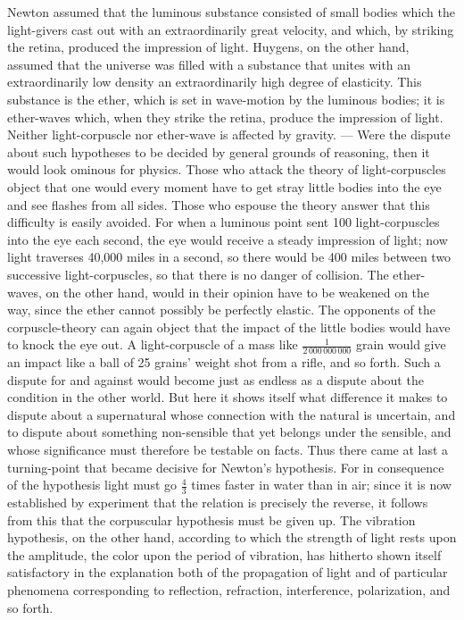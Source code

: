 \documentclass[12pt]{book}
\begin{document}
Newton assumed that the luminous substance consisted of small bodies which the
light-givers cast out with an extraordinarily great velocity, and which, by striking
the retina, produced the impression of light. Huygens, on the other hand, assumed that
the universe was filled with a substance that unites with an extraordinarily low
density an extraordinarily high degree of elasticity. This substance is the ether,
which is set in wave-motion by the luminous bodies; it is ether-waves which, when they
strike the retina, produce the impression of light. Neither light-corpuscle nor
ether-wave is affected by gravity. --- Were the dispute about such hypotheses to be
decided by general grounds of reasoning, then it would look ominous for physics. Those
who attack the theory of light-corpuscles object that one would every moment have to
get stray little bodies into the eye and see flashes from all sides. Those who espouse
the theory answer that this difficulty is easily avoided. For when a luminous point
sent 100 light-corpuscles into the eye each second, the eye would receive a steady
impression of light; now light traverses 40,000 miles in a second, so there would be
400 miles between two successive light-corpuscles, so that there is no danger of
collision. The ether-waves, on the other hand, would in their opinion have to be
weakened on the way, since the ether cannot possibly be perfectly elastic. The
opponents of the corpuscle-theory can again object that the impact of the little
bodies would have to knock the eye out. A light-corpuscle of a mass like
$\frac{1}{2\,000\,000\,000}$ grain would give an impact like a ball of 25 grains'
weight shot from a rifle, and so forth. Such a dispute for and against would become
just as endless as a dispute about the condition in the other world. But here it shows
itself what difference it makes to dispute about a supernatural whose connection with
the natural is uncertain, and to dispute about something non-sensible that yet belongs
under the sensible, and whose significance must therefore be testable on facts. Thus
there came at last a turning-point that became decisive for Newton's hypothesis. For
in consequence of the hypothesis light must go $\tfrac43$ times faster in water than
in air; since it is now established by experiment that the relation is precisely the
reverse, it follows from this that the corpuscular hypothesis must be given up. The
vibration hypothesis, on the other hand, according to which the strength of light
rests upon the amplitude, the color upon the period of vibration, has hitherto shown
itself satisfactory in the explanation both of the propagation of light and of
particular phenomena corresponding to reflection, refraction, interference,
polarization, and so forth.
\end{document}
